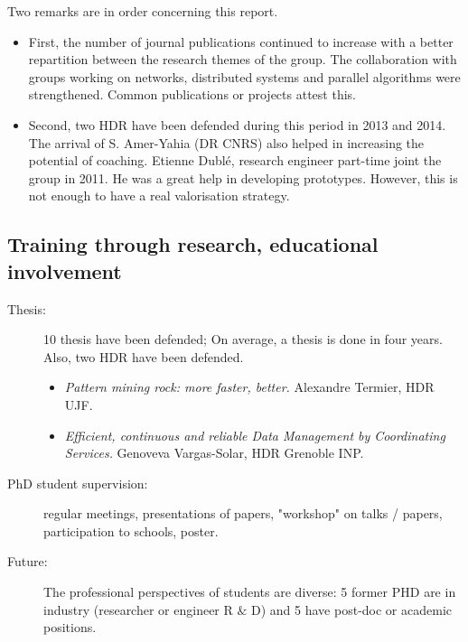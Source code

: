 \noindent Two remarks are in order concerning this report.
\begin{itemize} 
\setlength{\itemsep}{-0.4cm}
\item First, the number of journal publications continued to increase  with a better repartition between the research themes of the group. The collaboration with groups working on networks, distributed systems and parallel algorithms were strengthened. Common publications or projects attest this. \\
\item Second, two  HDR  have been defended during this period in 2013 and 2014. The arrival of S. Amer-Yahia (DR CNRS) also helped in increasing the potential of coaching. 
Etienne Dubl{\'e}, research engineer part-time joint the group in 2011. He was a great help in developing prototypes. However, this  is not enough to have  a real valorisation strategy. 
\end{itemize}


\subsection{Training through research, educational involvement} %
\label{sub:hadas_training_through_research_educational_involvment}


\begin{description}

\item[Thesis:]  10 thesis have been defended;  On average, a thesis is done in four years. 
Also, two HDR have been defended. 
\begin{itemize}
\item \emph{Pattern mining rock: more faster, better.} Alexandre Termier, HDR UJF. 

\item \emph{Efficient, continuous and reliable Data Management by Coordinating Services.} Genoveva Vargas-Solar, HDR Grenoble INP. 
\end{itemize}

\item[PhD student supervision:] regular meetings, presentations of papers, "workshop" on talks / papers, participation to schools, poster.

\item[Future:]  
The professional perspectives of students are diverse: 5 former PHD are in industry (researcher or engineer R  $\&$ D) and 5 have post-doc or academic positions. 

\end{description}


